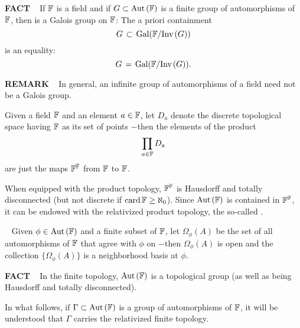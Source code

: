 \begin{x}{\small\bf FACT} \ %
If $\mathbb{F}$ is a field and if $G \subset \text{Aut}\hspace{0.05 cm}(\mathbb{F})$ is a finite group of automorphisms of $\mathbb{F}$, then \mG is a Galois group on $\mathbb{F}$: 
The a priori containment
\[
G \hspace{0.05cm}\subset\hspace{0.05cm} \text{Gal}(\mathbb{F} / \text{Inv}\hspace{0.05cm}(G))
\]
is an equality: 
\[
G \hspace{0.05cm} = \hspace{0.05cm} \text{Gal}(\mathbb{F} / \text{Inv}\hspace{0.05cm}(G)).
\]
\end{x}

\vspace{0.1cm}

\begin{x}{\small\bf REMARK} \ %
In general, an infinite group of automorphisms of a field need not be a Galois group.
\end{x}

\vspace{0.1cm}

Given a field $\mathbb{F}$ and an element $a \in \mathbb{F}$, let $D_a$ denote the discrete topological space having $\mathbb{F}$ as its set of points 
$-$then the elements of the product
\[
\prod\limits_{a \in \mathbb{F}} D_a
\]
are just the maps $\mathbb{F}^{\mathbb{F}}$ from $\mathbb{F}$ to $\mathbb{F}$.

When equipped with the product topology, $\mathbb{F}^{\mathbb{F}}$  is Hausdorff and totally disconnected 
(but not discrete if $\text{card}\hspace{0.05cm} \mathbb{F} \geq \aleph_0$).  
Since $\text{Aut}\hspace{0.05 cm}(\mathbb{F})$ is contained in $\mathbb{F}^{\mathbb{F}}$, it can be endowed with the relativized product topology, the so-called 
.
\vspace{0.2cm}


\begin{x}{\small\bf {}} \ %
Given $\phi \in \text{Aut}\hspace{0.05 cm}(\mathbb{F})$ and a finite subset \mA of $\mathbb{F}$, let $\Omega_\phi(A)$ be the set of all automorphisms of $\mathbb{F}$ 
that agree with $\phi$ on \mA $-$then $\Omega_\phi(A)$ is open and the collection $\{\Omega_\phi(A)\}$ is a neighborhood basis at $\phi$.
\end{x}

\vspace{0.1cm}

\begin{x}{\small\bf FACT} \ %
In the finite topology, $\text{Aut}\hspace{0.05 cm}(\mathbb{F})$ is a topological group (as well as being Hausdorff and totally disconnected).
\end{x}

\vspace{0.1cm}

In what follows, if $\Gamma \subset \text{Aut}\hspace{0.05 cm}(\mathbb{F})$ is a group of automorphisms of $\mathbb{F}$, it will be understood that $\Gamma$ 
carries the relativized finite topology.

